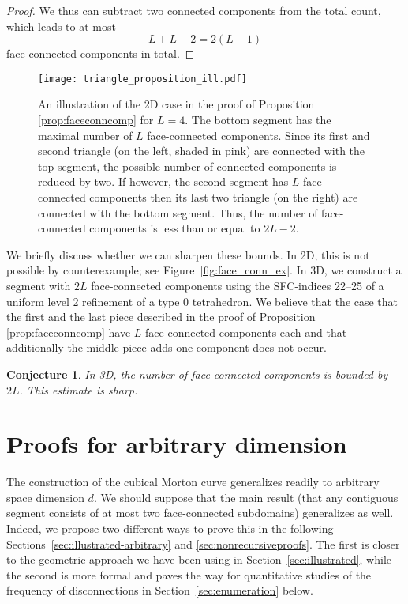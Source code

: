 \documentclass[a4paper,11pt]{article}
\newcommand{\seclab}[1]{\label{sec:#1}}
\newcommand{\secref}[1]{Section~\ref{sec:#1}}
\newtheorem{conj}[thm]{Conjecture}
\begin{document}
\begin{proof}
We thus can subtract two connected components from the total count, which leads
to at most
\begin{equation}
  L + L - 2 = 2(L-1)
\end{equation}
face-connected components in total.
\end{proof}

\begin{figure}
  \center
  \texttt{[image: triangle\_proposition\_ill.pdf]}
  \caption{An illustration of the 2D case in the proof of Proposition \ref{prop:faceconncomp} for 
  $L=4$. The bottom segment has the maximal number of $L$ face-connected components. 
  Since its first and second triangle (on the left, shaded in pink) are connected with the
  top segment, the possible number of connected components is reduced by two.
  If however, the second segment has $L$ face-connected components then its last two
  triangle (on the right) are connected with the bottom segment.
  Thus, the number of face-connected components is less than or equal to $2L-2$.}
  \label{fig:explaintrianglprop}
\end{figure}

We briefly discuss whether we can sharpen these bounds.
In 2D, this is not possible by counterexample; see Figure~\ref{fig:face_conn_ex}.
In 3D, we construct a segment with $2L$ face-connected components using the
SFC-indices 22--25 of a uniform level 2 refinement of a type 0
tetrahedron.
We believe that the case that the first and the last piece described in
the proof of Proposition \ref{prop:faceconncomp} have $L$ face-connected
components each and that additionally the middle piece adds one component
does not occur.
\begin{conj}
\label{con:3TMconjecture}
 In 3D, the number of face-connected components is bounded by $2L$.
 This estimate is sharp.
\end{conj}

\section{Proofs for arbitrary dimension}
\seclab{arbitrary}

The construction of the cubical Morton curve generalizes readily to
arbitrary space dimension $d$.
We should suppose that the main result (that any contiguous segment consists of
at most two face-connected subdomains) generalizes as well.
Indeed, we propose two different ways to prove this in the following
Sections~\ref{sec:illustrated-arbitrary} and \ref{sec:nonrecursiveproofs}.
The first is closer to the geometric approach we have been using in
\secref{illustrated}, while the second is more formal and paves the way for
quantitative studies of the frequency of disconnections in \secref{enumeration}
below.
\end{document}
